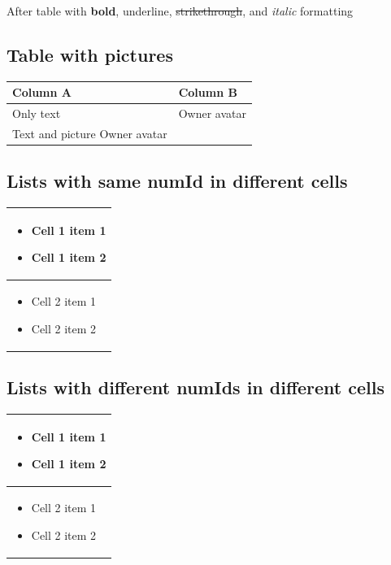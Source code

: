 \documentclass[11pt,a4paper]{article}
\begin{document}
After table with \textbf{bold}, underline, \sout{strikethrough}, and \textit{italic} formatting

\subsection{Table with pictures}

\begin{table}[h]
\begin{tabular}{|l|l|}
\hline
Column A & Column B \\ \hline
Only text & %
Owner avatar \\ \hline
Text and picture  %
Owner avatar &  \\ \hline
\end{tabular}
\end{table}

\subsection{Lists with same numId in different cells}

\begin{table}[h]
\begin{tabular}{|l|}
\hline
\begin{itemize} \item Cell 1 item 1 \item Cell 1 item 2 \end{itemize} \\ \hline
\begin{itemize} \item Cell 2 item 1 \item Cell 2 item 2 \end{itemize} \\ \hline
\end{tabular}
\end{table}

\subsection{Lists with different numIds in different cells}

\begin{table}[h]
\begin{tabular}{|l|}
\hline
\begin{itemize} \item Cell 1 item 1 \item Cell 1 item 2 \end{itemize} \\ \hline
\begin{itemize} \item Cell 2 item 1 \item Cell 2 item 2 \end{itemize} \\ \hline
\end{tabular}
\end{table}
\end{document}
